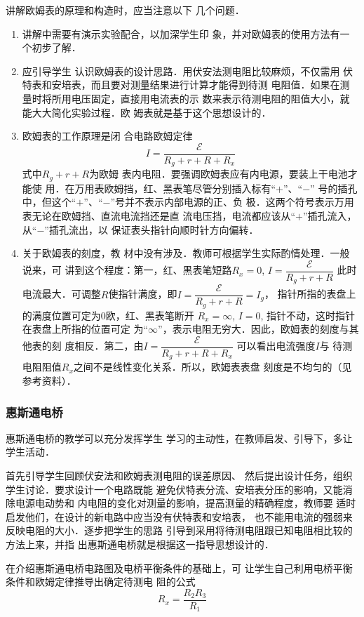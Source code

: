 讲解欧姆表的原理和构造时，应当注意以下
几个问题．
\begin{enumerate}
\item 讲解中需要有演示实验配合，以加深学生印
象，并对欧姆表的使用方法有一个初步了解．    
\item 应引导学生
认识欧姆表的设计思路．用伏安法测电阻比较麻烦，不仅需用
伏特表和安培表，而且要对测量结果进行计算才能得到待测
电阻值．如果在测量时将所用电压固定，直接用电流表的示
数来表示待测电阻的阻值大小，就能大大简化实验过程．欧
姆表就是基于这个思想设计的．   
 \item 欧姆表的工作原理是闭
合电路欧姆定律$$I=\dfrac{\mathcal{E}}{R_g+r+R+R_x}$$
式中$R_g+r+R$为欧姆
表内电阻．要强调欧姆表应有内电源，要装上干电池才能使
用．在万用表欧姆挡，红、黑表笔尽管分别插入标有“$+$”、“$-$”
号的插孔中，但这个“$+$”、“$-$”号并不表示内部电源的正、负
极．这两个符号表示万用表无论在欧姆挡、直流电流挡还是直
流电压挡，电流都应该从“$+$”插孔流入，从“$-$”插孔流出，以
保证表头指针向顺时针方向偏转．
\item 关于欧姆表的刻度，教
材中没有涉及．教师可根据学生实际酌情处理．一般说来，可
讲到这个程度：第一，红、黑表笔短路$R_x=0$, $I=\dfrac{\mathcal{E}}{R_g+r+R}$
此时电流最大．可调整$R$使指针满度，即$I=\dfrac{\mathcal{E}}{R_g+r+R}=I_g$，
指针所指的表盘上的满度位置可定为0欧，红、黑表笔断开
$R_x=\infty$, $I=0$, 指针不动，这时指针在表盘上所指的位置可定
为“$\infty$”，表示电阻无穷大．因此，欧姆表的刻度与其他表的刻
度相反．第二，由$I=\dfrac{\mathcal{E}}{R_g+r+R+R_x}$
可以看出电流强度$I$与
待测电阻阻值$R_x$之间不是线性变化关系．所以，欧姆表表盘
刻度是不均匀的（见参考资料）．
\end{enumerate}

\subsubsection{惠斯通电桥}

惠斯通电桥的教学可以充分发挥学生
学习的主动性，在教师启发、引导下，多让学生活动．

首先引导学生回顾伏安法和欧姆表测电阻的误差原因、
然后提出设计任务，组织学生讨论．要求设计一个电路既能
避免伏特表分流、安培表分压的影响，又能消除电源电动势和
内电阻的变化对测量的影响，提高测量的精确程度，教师要
适时启发他们，在设计的新电路中应当没有伏特表和安培表，
也不能用电流的强弱来反映电阻的大小．逐步把学生的思路
引导到采用将待测电阻跟已知电阻相比较的方法上来，并指
出惠斯通电桥就是根据这一指导思想设计的．

在介绍惠斯通电桥电路图及电桥平衡条件的基础上，可
让学生自己利用电桥平衡条件和欧姆定律推导出确定待测电
阻的公式
\[R_x=\frac{R_2R_3}{R_1}\]

